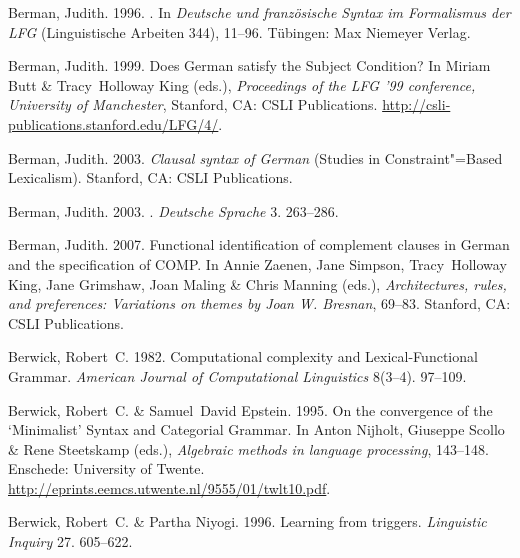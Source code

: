 \begin{thebibliography}{1420}
Berman, Judith. 1996.
.
\newblock In \emph{{Deutsche und franz{\"o}sische Syntax im Formalismus der
  LFG}} (Linguistische Arbeiten 344), 11--96. T{\"u}bingen: Max Niemeyer
  Verlag.

Berman, Judith. 1999.
\newblock Does {German} satisfy the {Subject Condition}?
\newblock In Miriam Butt \& Tracy~Holloway King (eds.), \emph{Proceedings of
  the {LFG '99} conference, {University of Manchester}}, Stanford, CA: CSLI
  Publications.
\newblock \urlprefix\url{http://csli-publications.stanford.edu/LFG/4/}.

Berman, Judith. 2003{}.
\newblock \emph{Clausal syntax of {German}}  (Studies in Constraint"=Based
  Lexicalism).
\newblock Stanford, CA: CSLI Publications.

Berman, Judith. 2003{}.
.
\newblock \emph{Deutsche Sprache} 3. 263--286.

Berman, Judith. 2007.
\newblock Functional identification of complement clauses in {German} and the
  specification of {COMP}.
\newblock In Annie Zaenen, Jane Simpson, Tracy~Holloway King, Jane Grimshaw,
  Joan Maling \& Chris Manning (eds.), \emph{Architectures, rules, and
  preferences: {Variations} on themes by {Joan W. Bresnan}}, 69--83. Stanford,
  CA: CSLI Publications.

Berwick, Robert~C. 1982.
\newblock Computational complexity and {Lexical-Functional Grammar}.
\newblock \emph{American Journal of Computational Linguistics} 8(3--4).
  97--109.

Berwick, Robert~C. \& Samuel~David Epstein. 1995.
\newblock On the convergence of the {`Minimalist' Syntax} and {Categorial
  Grammar}.
\newblock In Anton Nijholt, Giuseppe Scollo \& Rene Steetskamp (eds.),
  \emph{Algebraic methods in language processing}, 143--148. Enschede:
  University of Twente.
\newblock \urlprefix\url{http://eprints.eemcs.utwente.nl/9555/01/twlt10.pdf}.

Berwick, Robert~C. \& Partha Niyogi. 1996.
\newblock Learning from triggers.
\newblock \emph{Linguistic Inquiry} 27. 605--622.


\end{thebibliography}
